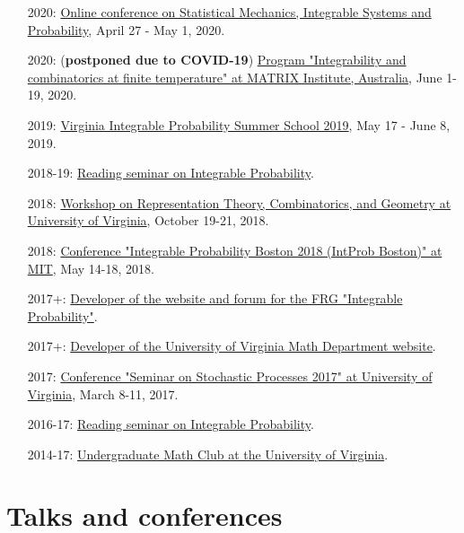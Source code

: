 \documentclass[letterpaper,11pt]{article}
\begin{document}
\begin{itemize}
\item [2020:]
\href{http://mtikhonov.com/smisp/}{Online conference on Statistical Mechanics, Integrable Systems and Probability},
April 27 - May 1, 2020.

\item [2020:]
(\textbf{postponed due to COVID-19})
\href{https://www.matrix-inst.org.au/events/integrability-and-combinatorics-at-finite-temperature/}{Program "Integrability and combinatorics at finite temperature" at MATRIX Institute, Australia},
June 1-19, 2020.

\item [2019:]
\href{http://vipss.int-prob.org/}{Virginia Integrable Probability Summer School 2019},
May 17 - June 8, 2019.

\item[2018-19:]
\href{https://lpetrov.cc/reading-2019/}{Reading seminar on Integrable Probability}.

\item [2018:]
\href{http://math.virginia.edu/ims/workshop-fall-2018/}{Workshop on Representation Theory, Combinatorics, and Geometry at University of Virginia},
October 19-21, 2018.

\item [2018:]
\href{http://frg.int-prob.org/conference2018/}{Conference "Integrable Probability Boston 2018 (IntProb Boston)" at MIT},
May 14-18, 2018.

\item [2017+:]
\href{http://frg.int-prob.org/}{Developer of the website and forum for the FRG "Integrable Probability"}.

\item [2017+:]
\href{http://math.virginia.edu/}{Developer of the University of Virginia Math Department website}.

\item [2017:]
\href{http://faculty.virginia.edu/ssp17/}{Conference "Seminar on Stochastic Processes 2017" at University of Virginia},
March 8-11, 2017.

\item [2016-17:]
\href{https://lpetrov.cc/2016/12/reading-seminar/}{Reading seminar on Integrable Probability}.

\item [2014-17:]
\href{http://math.virginia.edu/seminars/mathclub/}{Undergraduate Math Club at the University of Virginia}.
\end{itemize}

\section*{Talks and conferences}
\end{document}

